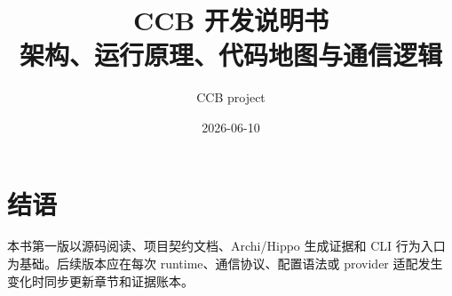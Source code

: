 \documentclass[12pt,openany]{book}
\title{CCB 开发说明书\\\large 架构、运行原理、代码地图与通信逻辑}
\author{CCB project}
\date{2026-06-10}
\begin{document}
\frontmatter
{}
\tableofcontents



\mainmatter













\appendix







\backmatter
\chapter*{结语}
本书第一版以源码阅读、项目契约文档、Archi/Hippo 生成证据和 CLI 行为入口为基础。后续版本应在每次 runtime、通信协议、配置语法或 provider 适配发生变化时同步更新章节和证据账本。
\end{document}
